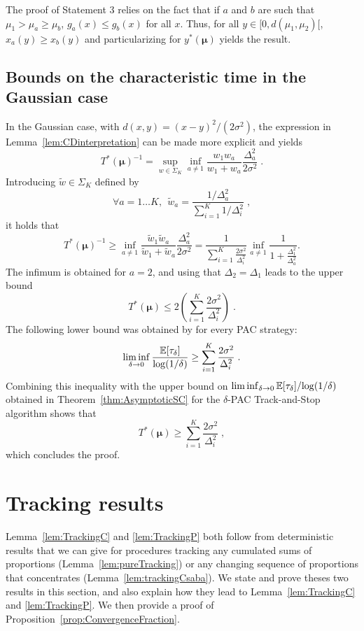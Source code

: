 \documentclass{colt2016} %
\begin{document}
The proof of Statement 3 relies on the fact that if $a$ and $b$ are such that $\mu_1 > \mu_a \geq \mu_b$, $g_a(x) \leq g_b(x)$ for all $x$. Thus, for all $y \in [0,d(\mu_1,\mu_2)[$, $x_a(y) \geq x_b(y)$ and particularizing for $y^*(\bm \mu)$ yields the result. 

\subsection{Bounds on the characteristic time in the Gaussian case}\label{proof:BoundGaussian}

In the Gaussian case, with $d(x,y)=(x-y)^2/(2\sigma^2)$, the expression in Lemma~\ref{lem:CDinterpretation} can be made more explicit and yields 
\[T^*(\bm\mu)^{-1} = \sup_{w \in \Sigma_K}\inf_{a \neq 1} \frac{w_1w_a}{w_1 + w_a}\frac{\Delta_a^2}{2\sigma^2}\;.\]
%
Introducing $\tilde{w}\in\Sigma_K$ defined by
\[\forall a = 1 \dots K, \ \ \tilde{w}_a = \frac{1/\Delta_a^2}{\sum_{i=1}^K 1/\Delta_i^2}\;,\]
it holds that 
\[T^*(\bm\mu)^{-1} \geq \inf_{a \neq 1} \frac{\tilde{w}_1\tilde{w}_a}{\tilde{w}_1 + \tilde{w}_a}\frac{\Delta_a^2}{2\sigma^2} = \frac{1}{\sum_{i=1}^K\frac{2\sigma^2}{\Delta_i^2}}\inf_{a \neq 1}\frac{1}{1 + \frac{\Delta_1^2}{\Delta_a^2}}.\]
The infimum is obtained for $a=2$, and using that $\Delta_2=\Delta_1$ leads to the upper bound
\[T^*(\bm\mu) \leq 2 \left(\sum_{i=1}^K \frac{2\sigma^2}{\Delta_i^2}\right)\;.\]
%
 The following lower bound was obtained by \cite{JMLR15} for every PAC strategy: 
\[\liminf_{\delta \rightarrow 0}\frac{\mathbb{E}[\tau_\delta]}{\log(1/\delta)} \geq \sum_{i=1}^K \frac{2\sigma^2}{\Delta_i^2}\;.\]
Combining this inequality with the upper bound on $\liminf_{\delta \rightarrow 0}{\mathbb{E}[\tau_\delta]}/{\log(1/\delta)}$ obtained in Theorem~\ref{thm:AsymptoticSC} for the $\delta$-PAC Track-and-Stop algorithm shows that 
\[T^*(\bm\mu) \geq \sum_{i=1}^K \frac{2\sigma^2}{\Delta_i^2}\;,\]
which concludes the proof.

\section{Tracking results}\label{proof:Tracking}

Lemma~\ref{lem:TrackingC} and \ref{lem:TrackingP} both follow from deterministic results that we can give for procedures tracking any cumulated sums of proportions (Lemma~\ref{lem:pureTracking}) or any changing sequence of proportions that concentrates (Lemma~\ref{lem:trackingCsaba}). We state and prove theses two results in this section, and also explain how they lead to Lemma~\ref{lem:TrackingC} and \ref{lem:TrackingP}. We then provide a proof of Proposition~\ref{prop:ConvergenceFraction}. 
\end{document}
